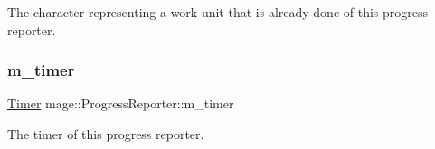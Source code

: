 The character representing a work unit that is already done of this progress reporter. \hypertarget{classmage_1_1_progress_reporter_aa3465bfcf344fd9f7f5f32255d90336b}{}\label{classmage_1_1_progress_reporter_aa3465bfcf344fd9f7f5f32255d90336b} 
\subsubsection{\texorpdfstring{m\+\_\+timer}{m\_timer}}
{\footnotesize\ttfamily \hyperlink{classmage_1_1_timer}{Timer} mage\+::\+Progress\+Reporter\+::m\+\_\+timer\hspace{0.3cm}{\ttfamily [private]}}

The timer of this progress reporter. 